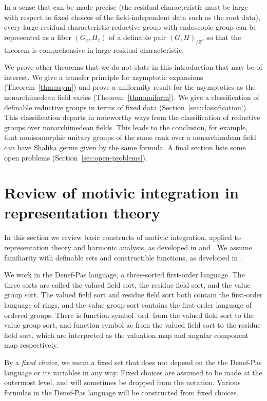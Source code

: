 \documentclass[12pt]{amsart}
\newcommand{\op}[1]{\operatorname{#1}}
\newcommand\ac{\overline{\mathrm{ac}}}
\theoremstyle{plain}
\theoremstyle{definition}
\begin{document}
In a sense that can be made precise (the residual characteristic must
be large with respect to fixed choices of the field-independent data
such as the root data), every large residual characteristic reductive
group with endoscopic group can be represented as a fiber $(G_z,H_z)$
of a definable pair $(G,H)_{/Z}$, so that the theorem is comprehensive in
large residual characteristic.

We prove other theorems that we do not state in this introduction that
may be of interest.  We give a transfer principle for asymptotic
expansions (Theorem~\ref{thm:asym}) and prove a uniformity result for
the asymptotics as the nonarchimedean field varies
(Theorem~\ref{thm:uniform}).  We give a classification of definable
reductive groups in terms of fixed data
(Section~\ref{sec:classification}).  This classification departs in
noteworthy ways from the classification of reductive groups over
nonarchimedean fields.  This leads to the conclusion, for example,
that nonisomorphic unitary groups of the same rank over a
nonarchimdean field can have Shalika germs given by the same formula.
A final section lists some open problems
(Section~\ref{sec:open-problems}).


\section{Review of motivic integration in representation theory}

In this section we review basic constructs of motivic integration,
applied to representation theory and harmonic analysis, as developed
in \cite{CHL} and \cite{CGH}.  We assume familiarity with definable
sets and constructible functions, as developed in \cite{CL}.

We work in the Denef-Pas language, a three-sorted first-order
language.  The three sorts are called the valued field sort, the
residue field sort, and the value group sort.  The valued field sort
and residue field sort both contain the first-order language of rings,
and the value group sort contains the first-order language of ordered
groups.  There is function symbol $\op{ord}$ from the valued field
sort to the value group sort, and function symbol $\ac$ from the
valued field sort to the residue field sort, which are interpreted as
the valuation map and angular component map respectively.

By a {\it fixed choice}, we mean a fixed set that does not depend
on the the Denef-Pas language or its variables in any way.  Fixed
choices are assumed to be made at the outermost level, and
will sometimes be dropped from the notation.  Various formulas
in the Denef-Pas language will be constructed from fixed choices.
\end{document}
